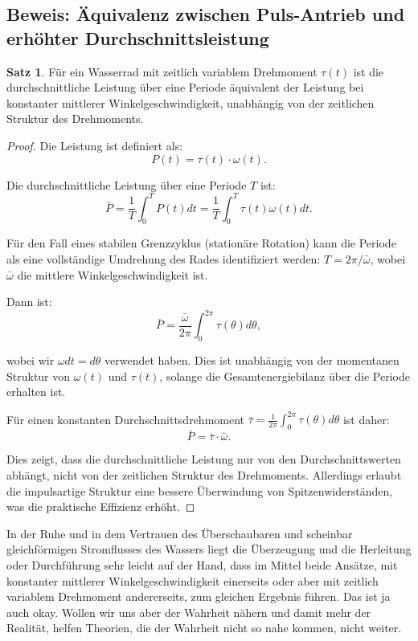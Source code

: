 \documentclass[a4paper,12pt]{article}
\theoremstyle{definition}
\newtheorem{satz}{Satz}
\begin{document}
\subsection{Beweis: Äquivalenz zwischen Puls-Antrieb und erhöhter Durchschnittsleistung}

\begin{satz}
Für ein Wasserrad mit zeitlich variablem Drehmoment $\tau(t)$ ist die durchschnittliche Leistung über eine Periode äquivalent der Leistung bei konstanter mittlerer Winkelgeschwindigkeit, unabhängig von der zeitlichen Struktur des Drehmoments.
\end{satz}

\begin{proof}
Die Leistung ist definiert als:
\[
P(t) = \tau(t) \cdot \omega(t).
\]

Die durchschnittliche Leistung über eine Periode $T$ ist:
\[
\bar{P} = \frac{1}{T} \int_0^T P(t) dt = \frac{1}{T} \int_0^T \tau(t) \omega(t) dt.
\]

Für den Fall eines stabilen Grenzzyklus (stationäre Rotation) kann die Periode als eine vollständige Umdrehung des Rades identifiziert werden: $T = 2\pi / \bar{\omega}$, wobei $\bar{\omega}$ die mittlere Winkelgeschwindigkeit ist.

Dann ist:
\[
\bar{P} = \frac{\bar{\omega}}{2\pi} \int_0^{2\pi} \tau(\theta) d\theta,
\]

wobei wir $\omega dt = d\theta$ verwendet haben. Dies ist unabhängig von der momentanen Struktur von $\omega(t)$ und $\tau(t)$, solange die Gesamtenergiebilanz über die Periode erhalten ist.

Für einen konstanten Durchschnittsdrehmoment $\bar{\tau} = \frac{1}{2\pi}\int_0^{2\pi} \tau(\theta) d\theta$ ist daher:
\[
\bar{P} = \bar{\tau} \cdot \bar{\omega}.
\]

Dies zeigt, dass die durchschnittliche Leistung nur von den Durchschnittswerten abhängt, nicht von der zeitlichen Struktur des Drehmoments. Allerdings erlaubt die impulsartige Struktur eine bessere Überwindung von Spitzenwiderständen, was die praktische Effizienz erhöht.
\end{proof}

In der Ruhe und in dem Vertrauen des Überschaubaren und scheinbar gleichförmigen Stromflusses des Wassers liegt die Überzeugung und die Herleitung oder Durchführung sehr leicht auf der Hand, dass im Mittel beide Ansätze, mit konstanter mittlerer Winkelgeschwindigkeit einerseits oder aber mit zeitlich variablem Drehmoment andererseits, zum gleichen Ergebnis führen. Das ist ja auch okay. Wollen wir uns aber der Wahrheit nähern und damit mehr der Realität, helfen Theorien, die der Wahrheit nicht so nahe kommen, nicht weiter.
\end{document}
